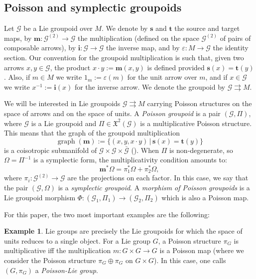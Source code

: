 \documentclass[a4paper,11pt]{amsart}
\theoremstyle{definition}
\newtheorem{ex}[thm]{Example}
\theoremstyle{remark}
\begin{document}
\subsection{Poisson and symplectic groupoids}                  \label{subsec:groupoids}                                       
Let ${\mathcal{G}}$ be a Lie groupoid over $M$. We denote by ${\mathbf{s}}$ and ${\mathbf{t}}$
the source and target maps, by ${\mathbf{m}}:{\mathcal{G}}^{(2)}\to{\mathcal{G}}$ the
multiplication (defined on the space ${\mathcal{G}}^{(2)}$ of pairs of
composable arrows), by $\textbf{i}:{\mathcal{G}}\to{\mathcal{G}}$ the inverse map, and
by ${\varepsilon}:M\to {\mathcal{G}}$ the identity section. Our convention for the
groupoid multiplication is such that, given two arrows $x,y\in{\mathcal{G}}$,
the product $x\cdot y:={\mathbf{m}}(x,y)$ is defined provided ${\mathbf{s}}(x)={\mathbf{t}}(y)$.
Also, if $m\in M$ we write $1_m:={\varepsilon}(m)$ for the unit arrow over
$m$, and if $x\in{\mathcal{G}}$ we write $x^{-1}:=\textbf{i}(x)$ for the
inverse arrow. We denote the groupoid by ${\mathcal{G}}{\rightrightarrows} M$.

We will be interested in Lie groupoids ${\mathcal{G}}{\rightrightarrows} M$ carrying Poisson structures on
the space of arrows and on the space of units. A \emph{Poisson groupoid} is a
pair $({\mathcal{G}},\Pi)$, where ${\mathcal{G}}$ is a Lie groupoid and $\Pi\in{\ensuremath{\mathfrak{X}}}^2({\mathcal{G}})$ is a multiplicative
Poisson structure. This means
that the graph of the groupoid multiplication
\[ \operatorname{graph}({\mathbf{m}}):=\{(x,y,x\cdot y) \,|\, {\mathbf{s}} (x) = {\mathbf{t}} (y)\}\]
is a coisotropic submanifold of ${\mathcal{G}}\times {\mathcal{G}}\times\bar{\mathcal{G}}$ (\cite{We}).
When $\Pi$ is non-degenerate, so $\Omega =\Pi^{-1}$ is a symplectic form,
the multiplicativity condition amounts to:
\begin{equation}
\label{eq:mult:symp}
{\mathbf{m}}^*\Omega=\pi_1^*\Omega+\pi_2^*\Omega,
\end{equation}
where $\pi_i:{\mathcal{G}}^{(2)}\to{\mathcal{G}}$ are the projections on each factor. In
this case, we say that the pair $({\mathcal{G}},\Omega)$ is a
\emph{symplectic groupoid}. A \emph{morphism of Poisson groupoids}
is a Lie groupoid morphism $\Phi:({\mathcal{G}}_1,\Pi_1)\to ({\mathcal{G}}_2,\Pi_2)$
which is also a Poisson map.

For this paper, the two most important examples are the following:

\begin{ex}
Lie groups are precisely the Lie groupoids for which the space of units reduces
to a single object. For a Lie group $G$, a Poisson structure $\pi_G$ is multiplicative
iff the multiplication $m:G\times G\to G$ is a Poisson map (where we consider the
Poisson structure $\pi_G\oplus\pi_G$ on $G\times G$). In this case,
one calls $(G,\pi_G)$ a \emph{Poisson-Lie group}.
\end{ex}
\end{document}
